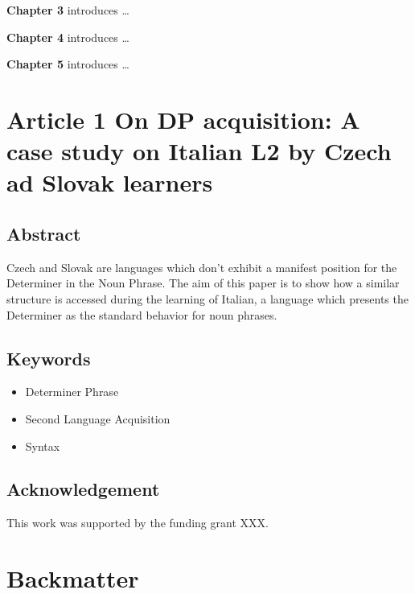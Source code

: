 \documentclass[a4paper,twoside,12pt,chapterprefix=false,bibliography=totocnumbered,listof=flat]{scrbook}
\providecommand{\tightlist}{%
  \setlength{\itemsep}{0pt}\setlength{\parskip}{0pt}}
\theoremstyle{definition}
\theoremstyle{definition}
\theoremstyle{definition}
\theoremstyle{remark}
\begin{document}
\textbf{Chapter 3} introduces \ldots{}

\textbf{Chapter 4} introduces \ldots{}

\textbf{Chapter 5} introduces \ldots{}

\chapter{Article 1 \textbar{} On DP acquisition: A case study on Italian
L2 by Czech ad Slovak
learners}\label{article-1-on-dp-acquisition-a-case-study-on-italian-l2-by-czech-ad-slovak-learners}

\section*{Abstract}\label{abstract-1}

Czech and Slovak are languages which don't exhibit a manifest position
for the Determiner in the Noun Phrase. The aim of this paper is to show
how a similar structure is accessed during the learning of Italian, a
language which presents the Determiner as the standard behavior for noun
phrases.

\section*{Keywords}\label{keywords-1}

\begin{itemize}
\tightlist
\item
  Determiner Phrase
\item
  Second Language Acquisition
\item
  Syntax
\end{itemize}

\section*{Acknowledgement}\label{acknowledgement}

This work was supported by the funding grant XXX.

\backmatter

\chapter*{Backmatter}\label{backmatter}
\end{document}
